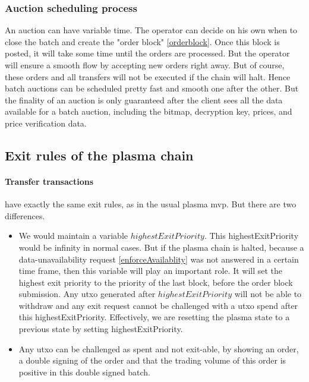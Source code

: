 \documentclass[11pt,parskip=full]{scrartcl}%
\begin{document}
\subsubsection{Auction scheduling process}
An auction can have variable time. 
The operator can decide on his own when to close the batch and create the "order block" \ref{orderblock}. 
Once this block is posted, it will take some time until the orders are processed. 
But the operator will ensure a smooth flow by accepting new orders right away. 
But of course, these orders and all transfers will not be executed if the chain will halt. 
Hence batch auctions can be scheduled pretty fast and smooth one after the other. 
But the finality of an auction is only guaranteed after the client sees all the data available for a batch auction, including the bitmap, decryption key, prices, and price verification data. 

\subsection{Exit rules of the plasma chain}
\label{exitRules}
\paragraph{Transfer transactions} have exactly the same exit rules, as in the usual plasma mvp. 
But there are two differences.
\begin{itemize}
 \item We would maintain a variable $highestExitPriority$. 
This highestExitPriority would be infinity in normal cases. 
But if the plasma chain is halted, because a data-unavailability request \ref{enforceAvailablity} was not answered in a certain time frame, then this variable will play an important role. 
It will set the highest exit priority to the priority of the last block, before the order block submission. 
Any utxo generated after $highestExitPriority$ will not be able to withdraw and any exit request cannot be challenged with a utxo spend after this highestExitPriority. 
Effectively, we are resetting the plasma state to a previous state by setting highestExitPriority. 
\item Any utxo can be challenged as spent and not exit-able, by showing an order, a double signing of the order and that the trading volume of this order is positive in this double signed batch. 
\end{itemize}
\end{document}
